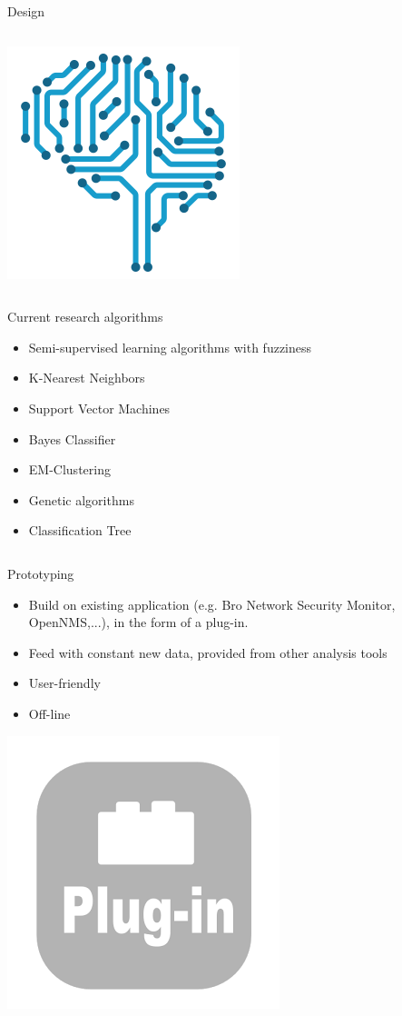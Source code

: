 \documentclass[11pt,t]{beamer}
\begin{document}
\begin{frame}{Design}
\begin{column}{.5\textwidth}
		\centering
		\includegraphics[width=.8\textwidth]{nn}
	\end{column}
\begin{column}{.5\textwidth}
Current research algorithms
\begin{itemize}
    \item Semi-supervised learning algorithms with fuzziness
    \item K-Nearest Neighbors
    \item Support Vector Machines
    \item Bayes Classifier
    \item EM-Clustering
    \item Genetic algorithms
    \item Classification Tree
\end{itemize}
	\end{column}

\end{frame}
\begin{frame}{Prototyping}
\begin{itemize}
    \item Build on existing application (e.g. Bro Network Security Monitor, OpenNMS,...), in the form of a plug-in.
    \item Feed with constant new data, provided from other analysis tools
    \item User-friendly
    \item Off-line
\end{itemize}
\begin{center}
    \includegraphics[width=.2\textwidth]{plugin}
\end{center}
\end{frame}
\end{document}
